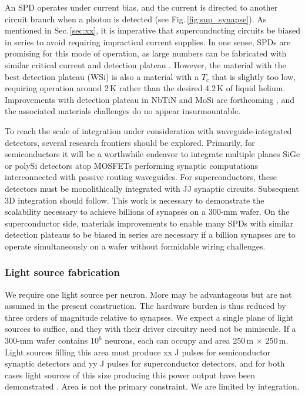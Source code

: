 \documentclass[twocolumn]{article}
\begin{document}
An SPD operates under current bias, and the current is directed to another circuit branch when a photon is detected (see Fig.\,\ref{fig:sup_synapse}). As mentioned in Sec.\,\ref{sec:xx}, it is imperative that superconducting circuits be biased in series to avoid requiring impractical current supplies. In one sense, SPDs are promising for this mode of operation, as large numbers can be fabricated with similar critical current and detection plateau \cite{buta2020}. However, the material with the best detection plateau (WSi) is also a material with a $T_c$ that is slightly too low, requiring operation around 2\,K rather than the desired 4.2\,K of liquid helium. Improvements with detection plateau in NbTiN and MoSi are forthcoming \cite{}, and the associated materials challenges do no appear insurmountable.
 
To reach the scale of integration under consideration with waveguide-integrated detectors, several research frontiers should be explored. Primarily, for semiconductors it will be a worthwhile endeavor to integrate multiple planes SiGe or polySi detectors atop MOSFETs performing synaptic computations interconnected with passive routing waveguides. For superconductors, these detectors must be monolithically integrated with JJ synaptic circuits. Subsequent 3D integration should follow. This work is necessary to demonstrate the scalability necessary to achieve billions of synapses on a 300-mm wafer. On the superconductor side, materials improvements to enable many SPDs with similar detection plateaus to be biased in series are necessary if a billion synapses are to operate simultaneously on a wafer without formidable wiring challenges. 

\subsubsection{Light source fabrication}
We require one light source per neuron. More may be advantageous but are not assumed in the present construction. The hardware burden is thus reduced by three orders of magnitude relative to synapses. We expect a single plane of light sources to suffice, and they with their driver circuitry need not be miniscule. If a 300-mm wafer contains $10^6$ neurons, each can occupy and area 250\,\textmu m $\times$ 250\,\textmu m. Light sources filling this area must produce xx J pulses for semiconductor synaptic detectors and yy J pulses for superconductor detectors, and for both cases light sources of this size producing this power output have been demonstrated \cite{}. Area is not the primary constraint. We are limited by integration.
\end{document}

